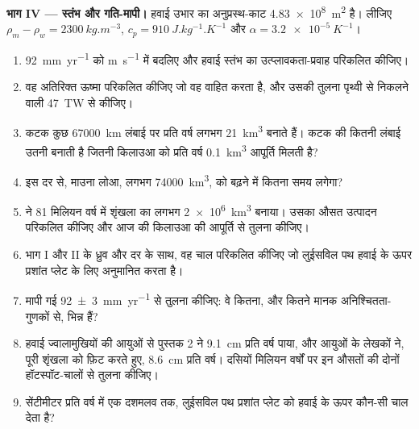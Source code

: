 \begin{problem}
\medskip
\noindent\textbf{भाग IV --- स्तंभ और गति-मापी।} हवाई उभार का अनुप्रस्थ-काट \qty{4.83e8}{m^2} है। लीजिए $\rho_m - \rho_w = \qty{2300}{kg.m^{-3}}$, $c_p = \qty{910}{J.kg^{-1}.K^{-1}}$ और $\alpha = \qty{3.2e-5}{K^{-1}}$।
\begin{enumerate}[resume]
  \item \qty{92}{mm.yr^{-1}} को \unit{m.s^{-1}} में बदलिए और हवाई स्तंभ का उत्प्लावकता-प्रवाह परिकलित कीजिए।
  \item वह अतिरिक्त ऊष्मा परिकलित कीजिए जो वह वाहित करता है, और उसकी तुलना पृथ्वी से निकलने वाली \qty{47}{TW} से कीजिए।
  \item कटक कुछ \qty{67000}{km} लंबाई पर प्रति वर्ष लगभग \qty{21}{km^3}  बनाते हैं। कटक की कितनी लंबाई उतनी  बनाती है जितनी किलाउआ को प्रति वर्ष \qty{0.1}{km^3} आपूर्ति मिलती है?
  \item इस दर से, माउना लोआ, लगभग \qty{74000}{km^3}, को बढ़ने में कितना समय लगेगा?
  \item {} ने 81 मिलियन वर्ष में शृंखला का लगभग \qty{2e6}{km^3} बनाया। उसका औसत उत्पादन परिकलित कीजिए और आज की किलाउआ की आपूर्ति से तुलना कीजिए।
  \item भाग I और II के ध्रुव और दर के साथ, वह चाल परिकलित कीजिए जो लुईसविल पथ हवाई  के ऊपर प्रशांत प्लेट के लिए अनुमानित करता है।
  \item मापी गई \qty[uncertainty-mode=separate]{92 \pm 3}{mm.yr^{-1}} से तुलना कीजिए: वे कितना, और कितने मानक अनिश्चितता-गुणकों से, भिन्न हैं?
  \item हवाई ज्वालामुखियों की आयुओं से पुस्तक 2 ने \qty{9.1}{cm} प्रति वर्ष पाया, और आयुओं के लेखकों ने, पूरी शृंखला को फ़िट करते हुए, \qty{8.6}{cm} प्रति वर्ष। दसियों मिलियन वर्षों पर इन औसतों की दोनों हॉटस्पॉट-चालों से तुलना कीजिए।
  \item सेंटीमीटर प्रति वर्ष में एक दशमलव तक, लुईसविल पथ प्रशांत प्लेट को हवाई  के ऊपर कौन-सी चाल देता है?
\end{enumerate}
\end{problem}
